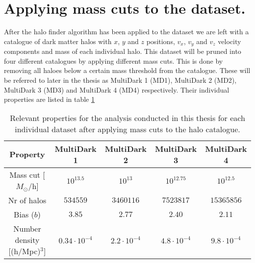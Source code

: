 \section{Applying mass cuts to the dataset.}
After the halo finder algorithm has been applied to the dataset we are left with a catalogue of dark matter halos with $x$, $y$ and $z$ positions, $v_x$, $v_y$ and $v_z$ velocity components and mass of each individual halo. This dataset will be pruned into four different catalogues by applying different mass cuts. This is done by removing all haloes below a certain mass threshold from the catalogue. These will be referred to later in the thesis as MultiDark 1 (MD1), MultiDark 2 (MD2), MultiDark 3 (MD3) and MultiDark 4 (MD4) respectively. Their individual properties are listed in table \ref{tab:MDproperties}
\begin{table}\label{tab:MDproperties}
    \begin{tabular}{| c | c | c | c | c | }
        \hline
        Property & MultiDark 1 & MultiDark 2 & MultiDark 3 & MultiDark 4 \\
        \hline
        Mass cut [$M_\odot$/h] & $10^{13.5}$ & $10^{13}$ & $10^{12.75}$ & $10^{12.5}$ \\ 
        Nr of halos &$534559$& $3460116$ & $7523817$& $15365856$ \\
        Bias ($b$) & $3.85$ & $2.77$ & $2.40$ & $2.11$ \\
        Number density [(h/Mpc)$^3$] & $0.34\cdot10^{-4}$ & $2.2\cdot10^{-4}$ & $4.8\cdot10^{-4}$ & $9.8\cdot10^{-4}$ \\
        \hline
    \end{tabular}
    \caption{Relevant properties for the analysis conducted in this thesis for each individual dataset after applying mass cuts to the halo catalogue.}
\end{table}
